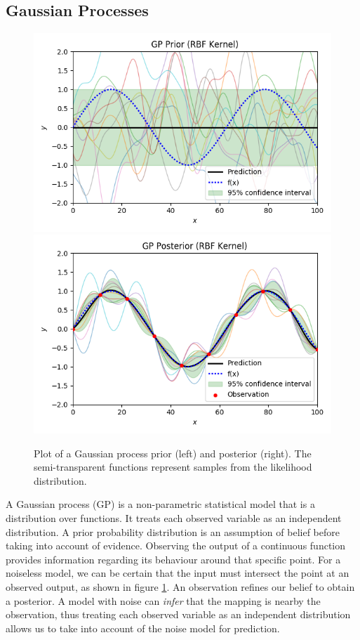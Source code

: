 \documentclass[ %
author={Dillon Keith Diep},
supervisor={Dr. Carl Henrik Ek},
degree={MEng},
title={ART-CG Hair:},
subtitle={Assisted Real-time Content Generation of Stylised Virtual Hair},
type={Research},
year={2017} ]{dissertation}
\begin{document}
\subsection{Gaussian Processes}
\begin{figure}[!h]
	\centering
	\includegraphics[scale=0.5]{images/gpPrior}
	\includegraphics[scale=0.5]{images/gpPosterior}
	\caption{Plot of a Gaussian process prior (left) and posterior (right). The semi-transparent functions represent samples from the likelihood distribution.}
	\label{gpplot}
\end{figure}
A Gaussian process (GP) is a non-parametric statistical model that is a distribution over functions. It treats each observed variable as an independent distribution. A prior probability distribution is an assumption of belief before taking into account of evidence. Observing the output of a continuous function provides information regarding its behaviour around that specific point. For a noiseless model, we can be certain that the input must intersect the point at an observed output, as shown in figure \ref{gpplot}. An observation refines our belief to obtain a posterior. A model with noise can \textit{infer} that the mapping is nearby the observation, thus treating each observed variable as an independent distribution allows us to take into account of the noise model for prediction.
\end{document}
